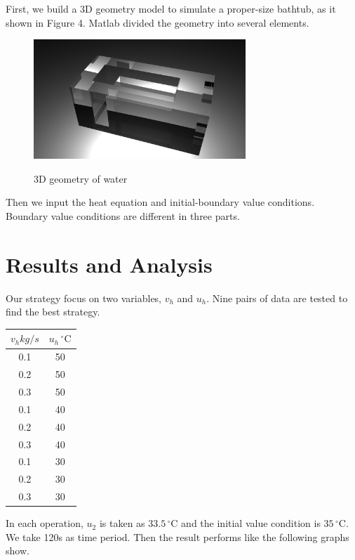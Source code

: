 \documentclass[12pt,a4paper,titlepage]{article}
\begin{document}
First, we build a 3D geometry model to simulate a proper-size bathtub, as it shown in Figure 4. Matlab divided the geometry into several elements.
\begin{figure}[htb]
  \centering
  \includegraphics[width=8cm]{4.png}\\
  \caption{3D geometry of water}\label{4_p}
\end{figure}

Then we input the heat equation and initial-boundary value conditions. Boundary value conditions are different in three parts.

\section{Results and Analysis}
\label{sec:performance-and-analysis}

Our strategy focus on two variables, $v_h$ and $u_h$. Nine pairs of data are tested to find the best strategy.
\begin{center}
\begin{tabular}{c|c}
\hline
    $v_h kg/s$  &${u_h}\,^{\circ}\mathrm{C}$        \\ \hline
     0.1             & 50              \\ \hline
    0.2             & 50              \\ \hline
     0.3             & 50              \\ \hline
     0.1             & 40              \\ \hline
     0.2             & 40              \\ \hline
     0.3             & 40              \\ \hline
     0.1             & 30              \\ \hline
     0.2             & 30              \\ \hline
     0.3             & 30              \\ \hline
\end{tabular}
\end{center}
In each operation, $u_2$ is taken as $33.5\,^{\circ}\mathrm{C}$
and the initial value condition is $35\,^{\circ}\mathrm{C}$.
 We take 120s as time period. Then the result performs like the following graphs show.
\end{document}
